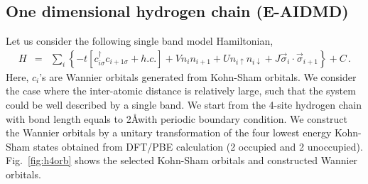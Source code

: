 \documentclass[prl,12pt,onecolumn,nofootinbib,notitlepage,english,superscriptaddress]{revtex4-1}
\begin{document}
\subsection{One dimensional hydrogen chain (E-AIDMD)}
Let us consider the following single band model Hamiltonian,
\begin{eqnarray}\label{eq:h4model}
H &=& \sum_{i}\left\{-t[c^{\dagger}_{i\sigma}c_{i+1\sigma} +h.c.]+ Vn_{i}n_{i+1} + Un_{i\uparrow}n_{i\downarrow}+ J\vec \sigma_{i}\cdot \vec \sigma_{i+1}\right\} + C\,.
\end{eqnarray}
Here, $c_{i}$'s are Wannier orbitals generated from Kohn-Sham orbitals. We consider the case where the inter-atomic distance is relatively large, such that the system could be well described by a single band.  We start from the 4-site hydrogen chain with bond length equals to 2\AA with periodic boundary condition. We construct the Wannier orbitals by a unitary transformation of the four lowest energy Kohn-Sham states obtained from DFT/PBE calculation (2 occupied and 2 unoccupied). Fig.~\ref{fig:h4orb} shows the selected Kohn-Sham orbitals and constructed Wannier orbitals. 
\end{document}
